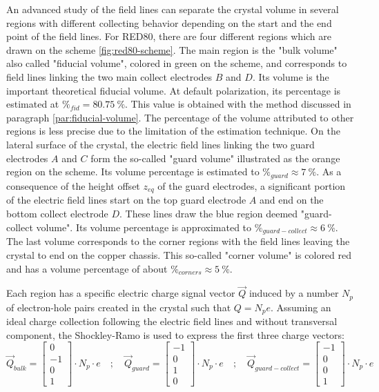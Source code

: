 An advanced study of the field lines can separate the crystal volume in several regions with different collecting behavior depending on the start and the end point of the field lines. For RED80, there are four different regions which are drawn on the scheme \ref{fig:red80-scheme}. 
The main region is the "bulk volume" also called "fiducial volume", colored in green on the scheme, and corresponds to field lines linking the two main collect electrodes $B$ and $D$. Its volume is the important theoretical fiducial volume. At default polarization, its percentage is estimated at $\%_{fid}=\SI{80.75}{\percent}$. This value is obtained with the method discussed in paragraph \ref{par:fiducial-volume}. The percentage of the volume attributed to other regions is less precise due to the limitation of the estimation technique.
On the lateral surface of the crystal, the electric field lines linking the two guard electrodes $A$ and $C$ form the so-called "guard volume" illustrated as the orange region on the scheme. Its volume percentage is estimated to $\%_{guard} \approx \SI{7}{\percent}$. 
As a consequence of the height offset $z_{eq}$ of the guard electrodes, a significant portion of the electric field lines start on the top guard electrode $A$ and end on the bottom collect electrode $D$. These lines draw the blue region deemed "guard-collect volume". Its volume percentage is approximated to $\%_{guard-collect} \approx \SI{6}{\percent}$.
The last volume corresponds to the corner regions with the field lines leaving the crystal to end on the copper chassis. This so-called "corner volume" is colored red and has a volume percentage of about $\%_{corners} \approx \SI{5}{\percent}$.

Each region has a specific electric charge signal vector $\vec{Q}$ induced by a number $N_p$ of electron-hole pairs created in the crystal such that $Q = N_p e$. Assuming an ideal charge collection following the electric field lines and without transversal component, the Shockley-Ramo is used to express the first three charge vectors:
\begin{equation}
\label{eq:red80-induced-charges}
\vec{Q}_{bulk} =
\begin{bmatrix}
0 \\ -1 \\ 0 \\ 1
\end{bmatrix}
\cdot N_p \cdot e
\quad ; \quad
\vec{Q}_{guard} =
\begin{bmatrix}
-1 \\ 0 \\ 1 \\ 0
\end{bmatrix}
\cdot N_p \cdot e
\quad ; \quad
\vec{Q}_{guard-collect} =
\begin{bmatrix}
-1 \\ 0 \\ 0 \\ 1
\end{bmatrix}
\cdot N_p \cdot e
\end{equation}

